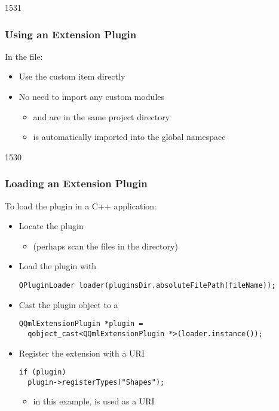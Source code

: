 \begin{slide}[fragile]{1531}\frametitle{Using an Extension Plugin}

In the  file:

\vspace*{0.5em}

\vspace*{0.5em}
\begin{itemize}
\item Use the custom item directly
\item No need to import any custom modules
  \begin{itemize}
  \item {} and  are in the same project
        directory
  \item {} is automatically imported into the global namespace
  \end{itemize}
\end{itemize}


\end{slide}

\begin{slide}[fragile]{1530}\frametitle{Loading an Extension Plugin}

To load the plugin in a C++ application:

\begin{itemize}
\item Locate the plugin
  \begin{itemize}
  \item (perhaps scan the files in the  directory)
  \end{itemize}
\item Load the plugin with 
\begin{lstlisting}
QPluginLoader loader(pluginsDir.absoluteFilePath(fileName));
\end{lstlisting}
\vspace*{0.5em}
\item Cast the plugin object to a 
\begin{lstlisting}
QQmlExtensionPlugin *plugin =
  qobject_cast<QQmlExtensionPlugin *>(loader.instance());
\end{lstlisting}
\vspace*{0.5em}
\item Register the extension with a URI
\begin{lstlisting}
if (plugin)
  plugin->registerTypes("Shapes");
\end{lstlisting}
  \begin{itemize}
  \item in this example,  is used as a URI
  \end{itemize}
\end{itemize}

\end{slide}

